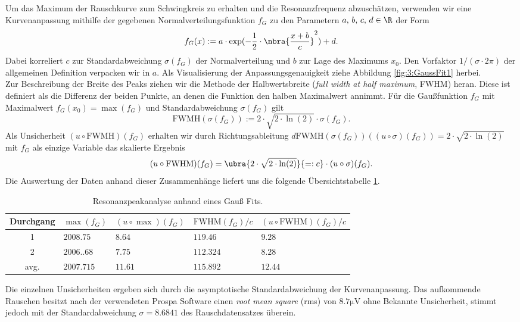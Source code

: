 \documentclass{article}
\begin{document}
    Um das Maximum der Rauschkurve zum Schwingkreis zu erhalten und die Resonanzfrequenz abzuschätzen, verwenden wir eine Kurvenanpassung mithilfe der gegebenen Normalverteilungsfunktion $f_G$ zu den Parametern $a,\, b,\, c,\, d\in\R$ der Form
    \[
        f_G(x) := a\cdot\exp(-\frac{1}{2}\cdot\nbra{\frac{x + b}{c}}^2) + d.
    \]
    Dabei korreliert $c$ zur Standardabweichung $\sigma(f_G)$ der Normalverteilung und $b$ zur Lage des Maximums $x_0$. Den Vorfaktor $1/(\sigma\cdot 2\pi)$ der allgemeinen Definition verpacken wir in $a$. Als Visualisierung der Anpassungsgenauigkeit ziehe Abbildung \ref{fig:3:GaussFit1} herbei. \\
    Zur Beschreibung der Breite des Peaks ziehen wir die Methode der Halbwertsbreite (\emph{full width at half maximum}, FWHM) heran. Diese ist definiert als die Differenz der beiden Punkte, an denen die Funktion den halben Maximalwert annimmt. Für die Gaußfunktion $f_G$ mit Maximalwert $f_G(x_0) = \max(f_G)$ und Standardabweichung $\sigma(f_G)$ gilt
    \[
        \text{FWMH}(\sigma(f_G)) := 2\cdot\sqrt{2\cdot\ln(2)}\cdot\sigma(f_G).
    \]
    Als Unsicherheit $(u\circ\text{FWMH})(f_G)$ erhalten wir durch Richtungsableitung $d\text{FWMH}(\sigma(f_G))((u\circ\sigma)(f_G)) = 2\cdot\sqrt{2\cdot\ln(2)}$ mit $f_G$ als einzige Variable das skalierte Ergebnis \cite[wiki]{enwiki:FWHM}
    \[
        (u\circ\text{FWHM})(f_G) = \ubra{2\cdot\sqrt{2\cdot\ln(2)}}{=:c}\cdot (u\circ\sigma)(f_G).
    \] 
    Die Auswertung der Daten anhand dieser Zusammenhänge liefert uns die folgende Übersichtstabelle \ref{tab:3:PeakInfo}.
    \begin{table}[H]
       \centering
       \begin{tabular}{c|ll|ll}
            \textbf{Durchgang} & $\max(f_G)$ & $(u\circ\max)(f_G)$ & $\text{FWHM}(f_G)/c$ & $(u\circ\text{FWHM})(f_G)/c$ \\
            \hline
            1 & $2008.75$ & $8.64$ & $119.46$ & $9.28$ \\
            2 & $2006..68$ & $7.75$ & $112.324$ & $8.28$ \\
            \hline
            avg. & $2007.715$ & $11.61$ & $115.892$ & $12.44$
        \end{tabular} 
        \caption{Resonanzpeakanalyse anhand eines Gauß Fits.}
        \label{tab:3:PeakInfo}
    \end{table}
    Die einzelnen Unsicherheiten ergeben sich durch die asymptotische Standardabweichung der Kurvenanpassung. Das aufkommende Rauschen besitzt nach der verwendeten Prospa Software einen \emph{root mean square} (rms) von $8.7\si{\micro\volt}$ ohne Bekannte Unsicherheit, stimmt jedoch mit der Standardabweichung $\sigma = 8.6841$ des Rauschdatensatzes überein. \\
\end{document}
